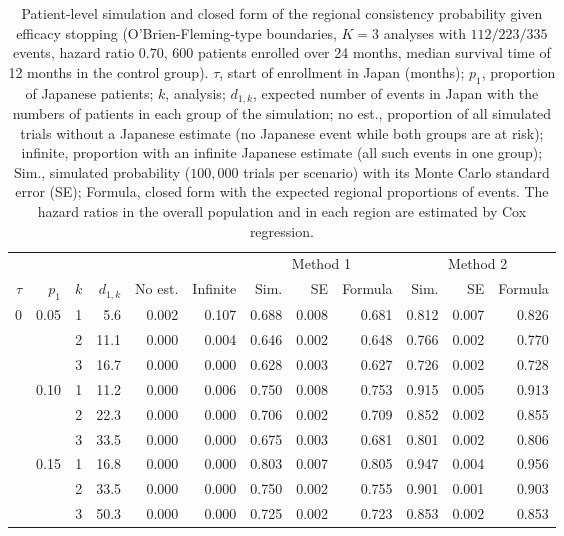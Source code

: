 \begin{table}[ht]
\centering
\footnotesize
\setlength{\tabcolsep}{3.5pt}
\caption{Patient-level simulation and closed form of the regional consistency probability given efficacy stopping (O'Brien-Fleming-type boundaries, $K = 3$ analyses with $112/223/335$ events, hazard ratio $0.70$, $600$ patients enrolled over 24 months, median survival time of 12 months in the control group). $\tau$, start of enrollment in Japan (months); $p_{1}$, proportion of Japanese patients; $k$, analysis; $d_{1,k}$, expected number of events in Japan with the numbers of patients in each group of the simulation; no est., proportion of all simulated trials without a Japanese estimate (no Japanese event while both groups are at risk); infinite, proportion with an infinite Japanese estimate (all such events in one group); Sim., simulated probability ($100{,}000$ trials per scenario) with its Monte Carlo standard error (SE); Formula, closed form with the expected regional proportions of events. The hazard ratios in the overall population and in each region are estimated by Cox regression.}
\label{tab:simulation}
\begin{tabular}{rrr rrr rrr rrr}
\toprule
 & & & & & & \multicolumn{3}{c}{Method 1} & \multicolumn{3}{c}{Method 2} \\
\cmidrule(lr){7-9}\cmidrule(lr){10-12}
$\tau$ & $p_{1}$ & $k$ & $d_{1,k}$ & No est. & Infinite & Sim. & SE & Formula & Sim. & SE & Formula \\
\midrule
0 & 0.05 & 1 & 5.6 & 0.002 & 0.107 & 0.688 & 0.008 & 0.681 & 0.812 & 0.007 & 0.826 \\
 &  & 2 & 11.1 & 0.000 & 0.004 & 0.646 & 0.002 & 0.648 & 0.766 & 0.002 & 0.770 \\
 &  & 3 & 16.7 & 0.000 & 0.000 & 0.628 & 0.003 & 0.627 & 0.726 & 0.002 & 0.728 \\
 & 0.10 & 1 & 11.2 & 0.000 & 0.006 & 0.750 & 0.008 & 0.753 & 0.915 & 0.005 & 0.913 \\
 &  & 2 & 22.3 & 0.000 & 0.000 & 0.706 & 0.002 & 0.709 & 0.852 & 0.002 & 0.855 \\
 &  & 3 & 33.5 & 0.000 & 0.000 & 0.675 & 0.003 & 0.681 & 0.801 & 0.002 & 0.806 \\
 & 0.15 & 1 & 16.8 & 0.000 & 0.000 & 0.803 & 0.007 & 0.805 & 0.947 & 0.004 & 0.956 \\
 &  & 2 & 33.5 & 0.000 & 0.000 & 0.750 & 0.002 & 0.755 & 0.901 & 0.001 & 0.903 \\
 &  & 3 & 50.3 & 0.000 & 0.000 & 0.725 & 0.002 & 0.723 & 0.853 & 0.002 & 0.853 \\

\end{tabular}
\end{table}
